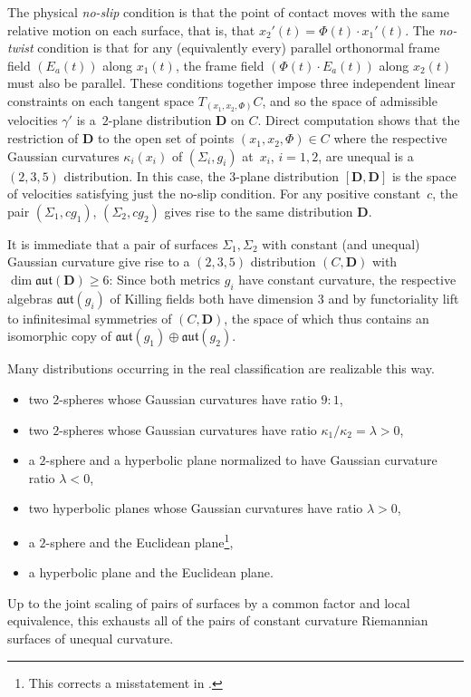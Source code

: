 \documentclass[10pt,a4paper]{amsart}
\newcommand{\bbR}{\mathbb{R}}
\newcommand{\mbD}{\mathbf{D}}
\newcommand{\mbO}{\mathbf{O}}
\newcommand{\mfaut}{\mathfrak{aut}}
\numberwithin{equation}{section}
\begin{document}
The physical \textit{no-slip} condition is that the point of contact moves with the same relative motion on each surface, that is, that $x_2'(t) = \Phi(t) \cdot x_1'(t)$. The \textit{no-twist} condition is that for any (equivalently every) parallel orthonormal frame field $(E_a(t))$ along $x_1(t)$, the frame field \mbox{$(\Phi(t) \cdot E_a(t))$} along $x_2(t)$ must also be parallel. These conditions together impose three independent linear constraints on each tangent space $T_{(x_1, x_2, \Phi)} C$, and so the space of admissible velocities $\gamma'$ is a~$2$-plane distribution $\mbD$ on $C$. Direct computation shows that the restriction of $\mbD$ to the open set of points $(x_1, x_2, \Phi) \in C$ where the respective Gaussian curvatures $\kappa_i({x_i})$ of $(\Sigma_i, g_i)$ at~$x_i$, $i = 1, 2$, are unequal is a $(2, 3, 5)$ distribution. In this case, the $3$-plane distribution $[\mbD, \mbD]$ is the space of velocities satisfying just the no-slip condition. For any positive constant~$c$, the pair $(\Sigma_1, c g_1)$, $(\Sigma_2, c g_2)$ gives rise to the same distribution $\mbD$.

It is immediate that a pair of surfaces $\Sigma_1, \Sigma_2$ with constant (and unequal) Gaussian curvature give rise to a $(2, 3, 5)$ distribution $(C, \mbD)$ with $\dim \mfaut(\mbD) \geq 6$: Since both metrics $g_i$ have constant curvature, the respective algebras $\mfaut(g_i)$ of Killing fields both have dimension $3$ and by functoriality lift to infinitesimal symmetries of $(C, \mbD)$, the space of which thus contains an isomorphic copy of $\mfaut(g_1) \oplus \mfaut(g_2)$.

Many distributions occurring in the real classification are realizable this way.
\begin{itemize}[leftmargin=1.5cm]\itemsep=0pt
	\item[$\mbO^{\bbR}$] two $2$-spheres whose Gaussian curvatures have ratio $9 : 1$,
	\item[$\mathbf{D.6}_{\lambda}^6$] two $2$-spheres whose Gaussian curvatures have ratio $\kappa_1 / \kappa_2 = \lambda > 0$,
	\item[$\mathbf{D.6}_{\lambda}^4$] a $2$-sphere and a hyperbolic plane normalized to have Gaussian curvature ratio $\lambda < 0$,
	\item[$\mathbf{D.6}_{\lambda}^{2+}$] two hyperbolic planes whose Gaussian curvatures have ratio $\lambda > 0$,
	\item[$\mathbf{D.6}_{\infty}^4$] a $2$-sphere and the Euclidean plane\footnote{This corrects a misstatement in \cite{WillseCounterexample}.},
	\item[$\mathbf{D.6}_{\infty}^{2}$] a hyperbolic plane and the Euclidean plane.
\end{itemize}
Up to the joint scaling of pairs of surfaces by a common factor and local equivalence, this exhausts all of the pairs of constant curvature Riemannian surfaces of unequal curvature.
\end{document}
